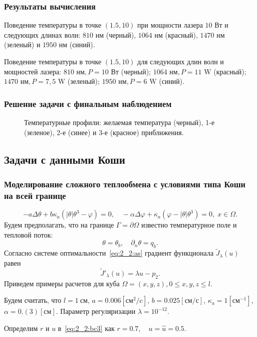 \begin{frame}
    \frametitle{Результаты вычисления}
    \begin{minipage}[t]{0.47\linewidth}
        \small{Поведение температуры в точке $(1.5,10)$
            при мощности лазера $10\text{~Вт}$ и следующих длинах волн:
            $810\text{~нм}$ (черный), $1064\text{~нм}$ (красный),
            $1470\text{~нм}$ (зеленый) и $1950\text{~нм}$ (синий).}
    \end{minipage}
    \hfill
    \begin{minipage}[t]{0.47\linewidth}
        \small{Поведение температуры в точке $(1.5,10)$
            для следующих длин волн и мощностей лазера:
            $810 \text{~нм}, P=10 \text{~Вт}$ (черный);
            $1064 \text{~нм}, P=11 \text{~W}$ (красный);
            $1470 \text{~нм}, P=7,5 \text{~W}$ (зеленый);
            $1950 \text{~нм}, P=6 \text{~W}$ (синий).}
    \end{minipage}
\end{frame}

\begin{frame}
    \frametitle{Решение задачи с финальным наблюдением}
    \begin{figure}[h!t]
        \caption{Температурные профили: желаемая температура (черный),
            1-е (зеленое), 2-е (синее) и 3-е (красное) приближения.}
        \label{fig:4_3:7}
    \end{figure}
\end{frame}

\subsection{Задачи с данными Коши}\label{subsec:koshi}
\begin{frame}
    \frametitle{Моделирование сложного теплообмена
    с условиями типа Коши на всей границе}
    \[
        - a\Delta\theta + b\kappa_a(|\theta|\theta^3- \varphi)=0,
        \quad -\alpha \Delta \varphi
        + \kappa_a(\varphi-|\theta|\theta^3)=0,\; x\in\Omega.
    \]
    Будем предполагать, что на границе $\Gamma = \partial \Omega$ известно
    температурное поле и тепловой поток:
    \[
        \theta = \theta_b,\quad \partial_n\theta = q_b.
    \]
    Согласно системе оптимальности~\eqref{eq:2_2:as} градиент функционала $\tilde J_\lambda(u)$ равен
    \[
        \tilde J'_\lambda (u) = \lambda u - p_2.
    \]
    Приведем примеры расчетов для куба $\Omega = {(x, y, z), 0 \leq x,y,z \leq l}$.

    Будем считать, что $l=1~\text{см}$, $a = 0.006[\text{см}^2/\text{c}]$,
    $b=0.025[\text{см}/\text{с}]$, $\kappa_a=1[\text{см}^{-1}]$, $\alpha = 0.(3)[\text{см}]$.
    Параметр регуляризации $\lambda=10^{-12}$.

    Определим $r$ и $u$ в~\eqref{eq:2_2:bc3} как $r = 0.7, \quad u = \hat u = 0.5$.
\end{frame}

